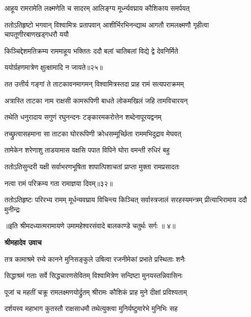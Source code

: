 \twolineshloka
{आहूय रामरामेति लक्ष्मणेति च सादरम्}
{आलिङ्ग्य मूर्ध्न्यवघ्राय कौशिकाय समर्पयत्} %

\threelineshloka
{ततोऽतिहृष्टो भगवान् विश्वामित्रः प्रतापवान्}
{आशीर्भिरभिनन्द्याथ आगतौ रामलक्ष्मणौ}
{गृहीत्वा चापतूणीरबाणखड्गधरौ ययौ} %

\twolineshloka
{किञ्चिद्देशमतिक्रम्य राममाहूय भक्तितः}
{ददौ बलां चातिबलां विद्ये द्वे देवनिर्मिते} %

{ययोर्ग्रहणमात्रेण क्षुत्क्षामादि न जायते॥२५॥} %


\twolineshloka
{तत उत्तीर्य गङ्गां ते ताटकावनमागमन्}
{विश्वामित्रस्तदा प्राह रामं सत्यपराक्रमम्} %

\twolineshloka
{अत्रास्ति ताटका नाम राक्षसी कामरूपिणी}
{बाधते लोकमखिलं जहि तामविचारयन्} %

\twolineshloka
{तथेति धनुरादाय सगुणं रघुनन्दनः}
{टङ्कारमकरोत्तेन शब्देनापूरयद्वनम्} %

\twolineshloka
{तच्छ्रुत्वासहमाना सा ताटका घोररूपिणी}
{क्रोधसम्मूर्च्छिता राममभिदुद्राव मेघवत्} %

\twolineshloka
{तामेकेन शरेणाशु ताडयामास वक्षसि}
{पपात विपिने घोरा वमन्ती रुधिरं बहु} %

\twolineshloka
{ततोऽतिसुन्दरी यक्षी सर्वाभरणभूषिता}
{शापात्पिशाचतां प्राप्ता मुक्ता रामप्रसादतः} %

{नत्वा रामं परिक्रम्य गता रामाज्ञया दिवम्॥३२॥} %


\fourlineindentedshloka
{ततोऽतिहृष्टः परिरभ्य रामम्}
{मूर्धन्यवघ्राय विचिन्त्य किञ्चित्}
{सर्वास्त्रजालं सरहस्यमन्त्रम्}
{प्रीत्याभिरामाय ददौ मुनीन्द्रः} %

{॥इति श्रीमदध्यात्मरामायणे उमामहेश्वरसंवादे
बालकाण्डे चतुर्थः सर्गः ॥ ४॥
}




\textbf{श्रीमहादेव उवाच}

\twolineshloka
{तत्र कामाश्रमे रम्ये कानने मुनिसङ्कुले}
{उषित्वा रजनीमेकां प्रभाते प्रस्थिताः शनैः} %

\twolineshloka
{सिद्धाश्रमं गताः सर्वे सिद्धचारणसेवितम्}
{विश्वामित्रेण सन्दिष्टा मुनयस्तन्निवासिनः} %

\twolineshloka
{पूजां च महतीं चक्रू रामलक्ष्मणयोर्द्रुतम्}
{श्रीरामः कौशिकं प्राह मुने दीक्षां प्रविश्यताम्} %

\twolineshloka
{दर्शयस्व महाभाग कुतस्तौ राक्षसाधमौ}
{तथेत्युक्त्वा मुनिर्यष्टुमारेभे मुनिभिः सह} %

